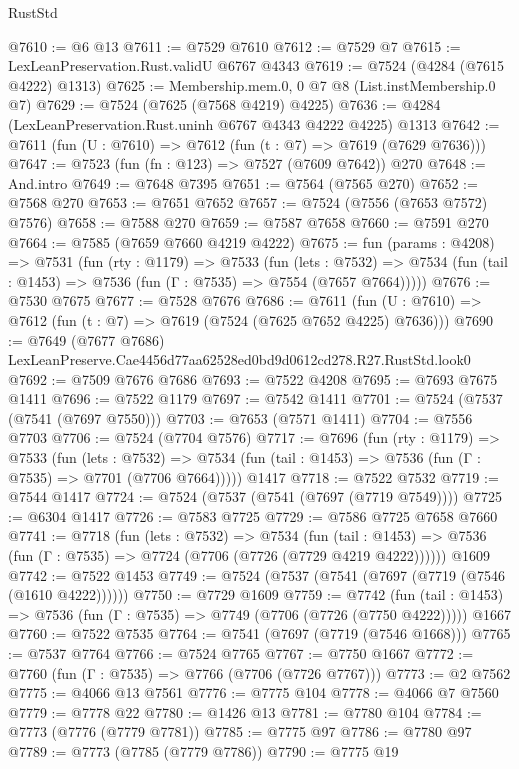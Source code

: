 \begin{lexlean}{RustStd}
\begin{coremodule}
@7610 := @6 @13
@7611 := @7529 @7610
@7612 := @7529 @7
@7615 := LexLeanPreservation.Rust.validU @6767 @4343
@7619 := @7524 (@4284 (@7615 @4222) @1313)
@7625 := Membership.mem.{0, 0} @7 @8 (List.instMembership.{0} @7)
@7629 := @7524 (@7625 (@7568 @4219) @4225)
@7636 := @4284 (LexLeanPreservation.Rust.uninh @6767 @4343 @4222 @4225) @1313
@7642 := @7611 (fun (U : @7610) => @7612 (fun (t : @7) => @7619 (@7629 @7636)))
@7647 := @7523 (fun (fn : @123) => @7527 (@7609 @7642)) @270
@7648 := And.intro
@7649 := @7648 @7395
@7651 := @7564 (@7565 @270)
@7652 := @7568 @270
@7653 := @7651 @7652
@7657 := @7524 (@7556 (@7653 @7572) @7576)
@7658 := @7588 @270
@7659 := @7587 @7658
@7660 := @7591 @270
@7664 := @7585 (@7659 @7660 @4219 @4222)
@7675 := fun (params : @4208) =>
  @7531
    (fun (rty : @1179) =>
    @7533
      (fun (lets : @7532) =>
      @7534 (fun (tail : @1453) => @7536 (fun (Γ : @7535) => @7554 (@7657 @7664)))))
@7676 := @7530 @7675
@7677 := @7528 @7676
@7686 := @7611 (fun (U : @7610) => @7612 (fun (t : @7) => @7619 (@7524 (@7625 @7652 @4225) @7636)))
@7690 := @7649 (@7677 @7686) LexLeanPreserve.Cae4456d77aa62528ed0bd9d0612cd278.R27.RustStd.look0
@7692 := @7509 @7676 @7686
@7693 := @7522 @4208
@7695 := @7693 @7675 @1411
@7696 := @7522 @1179
@7697 := @7542 @1411
@7701 := @7524 (@7537 (@7541 (@7697 @7550)))
@7703 := @7653 (@7571 @1411)
@7704 := @7556 @7703
@7706 := @7524 (@7704 @7576)
@7717 := @7696
    (fun (rty : @1179) =>
    @7533
      (fun (lets : @7532) =>
      @7534 (fun (tail : @1453) => @7536 (fun (Γ : @7535) => @7701 (@7706 @7664)))))
    @1417
@7718 := @7522 @7532
@7719 := @7544 @1417
@7724 := @7524 (@7537 (@7541 (@7697 (@7719 @7549))))
@7725 := @6304 @1417
@7726 := @7583 @7725
@7729 := @7586 @7725 @7658 @7660
@7741 := @7718
    (fun (lets : @7532) =>
    @7534
      (fun (tail : @1453) => @7536 (fun (Γ : @7535) => @7724 (@7706 (@7726 (@7729 @4219 @4222))))))
    @1609
@7742 := @7522 @1453
@7749 := @7524 (@7537 (@7541 (@7697 (@7719 (@7546 (@1610 @4222))))))
@7750 := @7729 @1609
@7759 := @7742
    (fun (tail : @1453) => @7536 (fun (Γ : @7535) => @7749 (@7706 (@7726 (@7750 @4222)))))
    @1667
@7760 := @7522 @7535
@7764 := @7541 (@7697 (@7719 (@7546 @1668)))
@7765 := @7537 @7764
@7766 := @7524 @7765
@7767 := @7750 @1667
@7772 := @7760 (fun (Γ : @7535) => @7766 (@7706 (@7726 @7767)))
@7773 := @2 @7562
@7775 := @4066 @13 @7561
@7776 := @7775 @104
@7778 := @4066 @7 @7560
@7779 := @7778 @22
@7780 := @1426 @13
@7781 := @7780 @104
@7784 := @7773 (@7776 (@7779 @7781))
@7785 := @7775 @97
@7786 := @7780 @97
@7789 := @7773 (@7785 (@7779 @7786))
@7790 := @7775 @19

\end{coremodule}
\end{lexlean}
